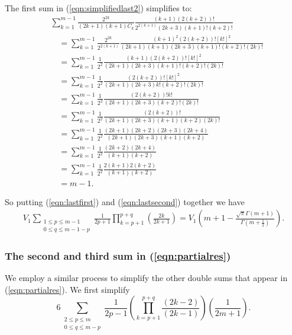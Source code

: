 \documentclass[11pt]{article}
\theoremstyle{definition}
\theoremstyle{definition}
\theoremstyle{plain}
\theoremstyle{plain}
\theoremstyle{plain}
\theoremstyle{definition}
\theoremstyle{definition}
\begin{document}
{The first sum in (\ref{eqn:simplifiedlast2}) simplifies to:
\begin{equation}\label{eqn:lastfirst}
\begin{aligned}
&\sum\limits_{k=1}^{m-1}\frac{2^{2k}}{(2k+1)(k+1)C_k}\frac{(k+1)(2(k+2))!}{2^{2(k+1)}(2k+3)(k+1)!(k+2)!} \\
&\quad= \sum\limits_{k=1}^{m-1}\frac{2^{2k}}{2^{2(k+1)}}\frac{(k+1)^2(2(k+2))![k!]^2}{(2k+1)(k+1)(2k+3)(k+1)!(k+2)!(2k)!} \\
&\quad= \sum\limits_{k=1}^{m-1}\frac{1}{2^2}\frac{(k+1)(2(k+2))![k!]^2}{(2k+1)(2k+3)(k+1)!(k+2)!(2k)!} \\
&\quad= \sum\limits_{k=1}^{m-1}\frac{1}{2^2}\frac{(2(k+2))![k!]^2}{(2k+1)(2k+3)k!(k+2)!(2k)!} \\
&\quad= \sum\limits_{k=1}^{m-1}\frac{1}{2^2}\frac{(2(k+2))!k!}{(2k+1)(2k+3)(k+2)!(2k)!} \\
&\quad = \sum\limits_{k=1}^{m-1}\frac{1}{2^2}\frac{(2(k+2))!}{(2k+1)(2k+3)(k+1)(k+2)(2k)!} \\
&\quad = \sum\limits_{k=1}^{m-1}\frac{1}{2^2}\frac{(2k+1)(2k+2)(2k+3)(2k+4)}{(2k+1)(2k+3)(k+1)(k+2)} \\
&\quad = \sum\limits_{k=1}^{m-1}\frac{1}{2^2}\frac{(2k+2)(2k+4)}{(k+1)(k+2)} \\
&\quad = \sum\limits_{k=1}^{m-1}\frac{1}{2^2}\frac{2(k+1)2(k+2)}{(k+1)(k+2)} \\
&\quad = m-1.
\end{aligned}
\end{equation}

So putting (\ref{eqn:lastfirst}) and (\ref{eqn:lastsecond}) together we have
\begin{equation}\label{eqn:lastsimp}
\begin{aligned}
V_1\sum\limits_{\substack{1\leq p \leq m -1 \\ 0 \leq q \leq m-1-p}}\frac{1}{2p+1}\prod\limits_{k=p+1}^{p+q}\left(\frac{2k}{2k+1}\right) = V_1\left(m+1 - \frac{\sqrt{\pi}\Gamma(m+1)}{\Gamma(m+\frac{1}{2})}\right).
\end{aligned}
\end{equation}

\subsubsection*{The second and third sum in (\ref{eqn:partialres})}

We employ a similar process to simplify the other double sums that appear in (\ref{eqn:partialres}). We first simplify
\begin{equation}\label{eqn:third}
6\sum\limits_{\substack{2 \leq p \leq m \\ 0 \leq q \leq m - p}} \frac{1}{2p-1}\left(\prod\limits_{k=p+1}^{p+q}\frac{(2k-2)}{(2k-1)}\right)\left(\frac{1}{2m+1}\right).
\end{equation}

}
\end{document}
